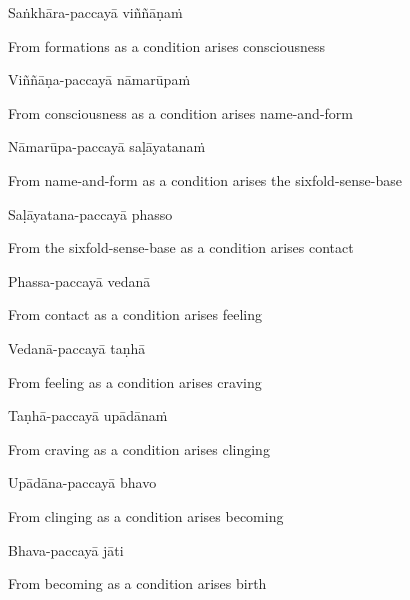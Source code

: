 Saṅkhāra-paccayā viññāṇaṁ

\begin{english}
  From formations as a condition arises consciousness
\end{english}

Viññāṇa-paccayā nāmarūpaṁ

\begin{english}
  From consciousness as a condition arises name-and-form
\end{english}

Nāmarūpa-paccayā saḷāyatanaṁ

\begin{english}
  From name-and-form as a condition arises the sixfold-sense-base
\end{english}

Saḷāyatana-paccayā phasso

\begin{english}
  From the sixfold-sense-base as a condition arises contact
\end{english}

Phassa-paccayā vedanā

\begin{english}
  From contact as a condition arises feeling
\end{english}

Vedanā-paccayā taṇhā

\begin{english}
  From feeling as a condition arises craving
\end{english}

Taṇhā-paccayā upādānaṁ

\begin{english}
  From craving as a condition arises clinging
\end{english}

Upādāna-paccayā bhavo

\begin{english}
  From clinging as a condition arises becoming
\end{english}

Bhava-paccayā jāti

\begin{english}
  From becoming as a condition arises birth
\end{english}


